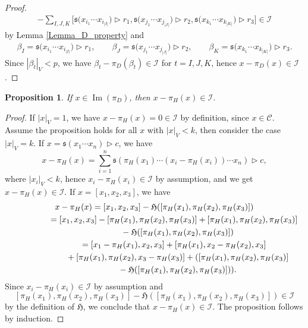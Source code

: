 \documentclass[10pt,a4paper]{amsart}
\newcommand{\Img}{\operatorname{Im}}
\numberwithin{equation}{section}
\newtheorem{Proposition}[Theorem]{Proposition}
 { \theoremstyle{definition}
\newtheorem{Definition}[Theorem]{Definition}
\newtheorem{Note}[Theorem]{Note}
\newtheorem{Example}[Theorem]{Example}
\newtheorem{Remark}[Theorem]{Remark} }
\begin{document}
\begin{proof}
\begin{gather*}
- \sum_{I,J,K} \bigl[ \mathfrak{s}\bigl(x_{i_1} \cdots x_{i_{|I|}}\bigr) \rhd r_1, \mathfrak{s}\bigl(x_{j_1} \cdots x_{j_{|J|}}\bigr) \rhd r_2, \mathfrak{s}\bigl(x_{k_1} \cdots x_{k_{|K|}}\bigr) \rhd r_3\bigr] \in \mathcal{I}
\end{gather*}
by Lemma \ref{Lemma_D_property} and
\begin{gather*}
 \beta_I = \mathfrak{s}\bigl(x_{i_1} \cdots x_{i_{|I|}}\bigr) \rhd r_1, \qquad
 \beta_J = \mathfrak{s}\bigl(x_{j_1} \cdots x_{j_{|J|}}\bigr)\rhd r_2, \qquad
 \beta_K = \mathfrak{s}\bigl(x_{k_1} \cdots x_{k_{|K|}}\bigr) \rhd r_3.
\end{gather*}
Since $|\beta_t|_V < p$, we have $\beta_t - \pi_D(\beta_t) \in \mathcal{I}$ for $t = I,J,K$, hence $x-\pi_D(x) \in \mathcal{I}$.
\end{proof}

\begin{Proposition}\label{id-h_in_I}
If $x \in \Img(\pi_D)$, then $x-\pi_H(x) \in \mathcal{I}$.
\end{Proposition}

\begin{proof}
If $|x|_V = 1$, we have $x-\pi_H(x) = 0 \in \mathcal{I}$ by definition, since $x \in \mathcal{C}$. Assume the proposition holds for all $x$ with $|x|_V<k$, then consider the case $|x|_V=k$. %
If $x = \mathfrak{s}(x_1 \cdots x_n) \rhd c$, we have
\[
x-\pi_H(x) = \sum_{i=1}^n \mathfrak{s}(\pi_H(x_1) \cdots (x_i - \pi_H(x_i)) \cdots x_n) \rhd c,
\]
where $|x_i|_V <k$, hence $x_i - \pi_H(x_i) \in \mathcal{I}$ by assumption, and we get $x-\pi_H(x) \in \mathcal{I}$. If $x = [x_1 ,x_2, x_3]$, we have
\begin{gather*}
 x- \pi_H(x) = [x_1, x_2, x_3] - \mathfrak{H}([\pi_H(x_1), \pi_H(x_2), \pi_H(x_3)]) \\ \hphantom{x- \pi_H(x)}{}
 = [x_1, x_2, x_3] - [\pi_H(x_1), \pi_H(x_2), \pi_H(x_3)] + [\pi_H(x_1), \pi_H(x_2), \pi_H(x_3)]\\ \hphantom{x- \pi_H(x)=}{}
 - \mathfrak{H}([\pi_H(x_1), \pi_H(x_2), \pi_H(x_3)]) \\ \hphantom{x- \pi_H(x)}{}
 = [x_1 - \pi_H(x_1), x_2 , x_3] + [\pi_H(x_1), x_2 - \pi_H(x_2), x_3]\\ \hphantom{x- \pi_H(x)=}{}
 + [\pi_H(x_1), \pi_H(x_2), x_3 - \pi_H(x_3)]+ ( [\pi_H(x_1), \pi_H(x_2), \pi_H(x_3)] \\ \hphantom{x- \pi_H(x)=}{}
 - \mathfrak{H}([\pi_H(x_1), \pi_H(x_2), \pi_H(x_3)]) ).
\end{gather*}
Since $x_i - \pi_H(x_i) \in \mathcal{I}$ by assumption and
\[
[\pi_H(x_1), \pi_H(x_2), \pi_H(x_3)] - \mathfrak{H}([\pi_H(x_1), \pi_H(x_2), \pi_H(x_3)]) \in \mathcal{I}
\]
 by the definition of $\mathfrak{H}$, we conclude that $x-\pi_H(x) \in \mathcal{I}$. The proposition follows by induction.
\end{proof}
\end{document}
